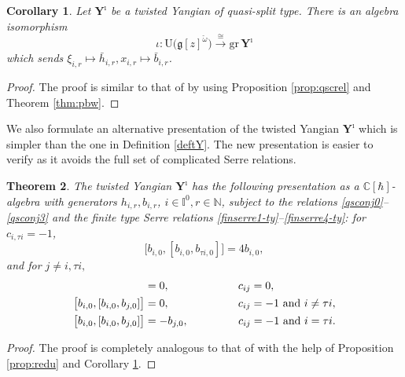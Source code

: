 \documentclass[11pt,reqno]{amsart}
\numberwithin{equation}{section}
\newtheorem{thm}{Theorem}[section]
\newtheorem{cor}[thm]{Corollary}
\theoremstyle{definition}
\theoremstyle{remark}
\newcommand{\beq}{\begin{equation}}
\newcommand{\eeq}{\end{equation}}
\newcommand{\g}{\mathfrak{g}}
\newcommand{\rU}{{\mathrm{U}}}
\newcommand{\Yi}{{\mathbf{Y}^\imath}}
\def \h{\hbar}
\def \H{h}
\def \X{b}
\def \I{\mathbb{I}}
\def \N{\mathbb{N}}
\def \C{\mathbb{C}}
\begin{document}
\begin{cor}
\label{cor:PBW2}
 Let $\Yi$ be a twisted Yangian of quasi-split type. There is an algebra isomorphism  
\[
\iota: \rU\big(\g[z]^{\check\omega}\big) \stackrel{\cong}{\longrightarrow} {\mathrm{gr}}\,\Yi
\]
which sends $\xi_{i,r}\mapsto \bar{\H}_{i,r}, x_{i,r}\mapsto  \bar{\X}_{i,r}$. 
\end{cor}
\begin{proof}
The proof is similar to that of \cite[Coro. 4.13]{KLWZ23b} by using Proposition \ref{prop:qscrel} and Theorem \ref{thm:pbw}.
\end{proof}

We also formulate an alternative presentation of the twisted Yangian $\Yi$ which is simpler than the one in Definition \ref{deftY}. The new presentation is easier to verify as it avoids the full set of complicated Serre relations.

\begin{thm}\label{thm:redu}
The twisted Yangian $\Yi$ has the following presentation as a $\C[\h]$-algebra with generators $h_{i,r},b_{i,r}$, $i\in\I^0,r\in\N$, subject to the relations \eqref{qsconj0}--\eqref{qsconj3} and the finite type Serre relations \eqref{finserre1-ty}--\eqref{finserre4-ty}: for $c_{i,\tau i}=-1$,
\beq\label{finserre1-ty}
\big[b_{i,0},[b_{i,0},b_{\tau i,0}]\big]  
= 4b_{i,0},
\eeq
and for $j\neq i,\tau i,$
\begin{align}
[b_{i,0},b_{j,0}]&=0,\hskip 2.2cm c_{ij}=0,\label{finserre2-ty}
\\
\big[b_{i,0},[b_{i,0},b_{j,0}]\big]& =0,\hskip 2.2cm c_{ij}=-1 \text{ and }i\ne \tau i, \label{finserre3-ty}\\
\big[b_{i,0},[b_{i,0},b_{j,0}]\big]& =-b_{j,0},\hskip 1.6cm c_{ij}=-1 \text{ and }i=\tau i.\label{finserre4-ty}
\end{align}
\end{thm}
\begin{proof}
The proof is completely analogous to that of \cite[Thm. 4.14]{KLWZ23b} with the help of Proposition \ref{prop:redu} and Corollary \ref{cor:PBW2}.
\end{proof}

\end{document}
